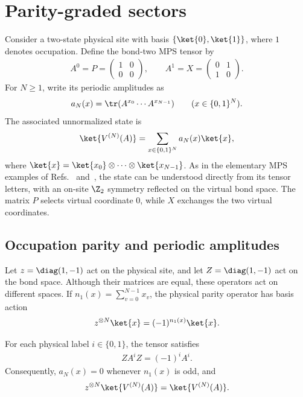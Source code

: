\section{Parity-graded sectors}%
\label{sec:asymex_parity}

Consider a two-state physical site with basis $\{\ket{0},\ket{1}\}$,
where $1$ denotes occupation. Define the bond-two MPS tensor by
\begin{align}
    A^0=P=\begin{pmatrix}1&0\\0&0\end{pmatrix},
    \qquad
    A^1=X=\begin{pmatrix}0&1\\1&0\end{pmatrix}.
    \label{eq:asymex_parity_letters}
\end{align}
For $N\geq1$, write its periodic amplitudes as
\begin{align}
    a_N(x)=\tr(A^{x_0}\cdots A^{x_{N-1}})
    \qquad (x\in\{0,1\}^N).
    \label{eq:asymex_parity_amplitudes}
\end{align}
The associated unnormalized state is
\begin{align}
    \ket{V^{(N)}(A)}
    =\sum_{x\in\{0,1\}^N}a_N(x)\ket{x},
    \label{eq:asymex_parity_state}
\end{align}
where $\ket{x}=\ket{x_0}\otimes\cdots\otimes\ket{x_{N-1}}$.
As in the elementary MPS examples of
Refs.~\cite[Section~II]{PerezGarcia2008StringOrder} and~\cite[Appendix~A]{Cirac2021Matrix},
the state can be understood directly from its tensor letters, with an on-site
$\Z_2$ symmetry reflected on the virtual bond space. The matrix $P$ selects virtual
coordinate $0$, while $X$ exchanges the two virtual coordinates.

\subsection{Occupation parity and periodic amplitudes}

Let $z=\diag(1,-1)$ act on the physical site, and let
$Z=\diag(1,-1)$ act on the bond space. Although their matrices are
equal, these operators act on different spaces. If
$n_1(x)=\sum_{v=0}^{N-1}x_v$, the physical parity operator has basis action
\begin{align}
    z^{\otimes N}\ket{x}=(-1)^{n_1(x)}\ket{x}.
    \label{eq:asymex_parity_basis}
\end{align}

\begin{lemma}
    \label{lem:asymex_parity_occupation}
    For each physical label $i\in\{0,1\}$, the tensor satisfies
    \begin{align}
        ZA^iZ=(-1)^iA^i.
        \label{eq:asymex_parity_covariance}
    \end{align}
    Consequently, $a_N(x)=0$ whenever $n_1(x)$ is odd, and
    \begin{align}
        z^{\otimes N}\ket{V^{(N)}(A)}=\ket{V^{(N)}(A)}.
        \label{eq:asymex_parity_invariance}
    \end{align}
\end{lemma}

